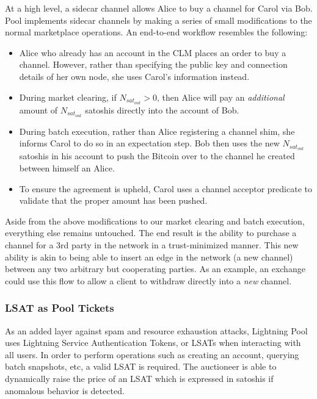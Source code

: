 \documentclass[10pt,a4paper]{article}
\theoremstyle{definition}
\begin{document}
At a high level, a sidecar channel allows Alice to buy a channel for Carol via
Bob. Pool implements sidecar channels by making a series of small modifications to
the normal marketplace operations. An end-to-end workflow resembles the
following:
\begin{itemize}
    \item Alice who already has an account in the CLM places an order to buy a
        channel. However, rather than specifying the public key and connection
        details of her own node, she uses Carol's information instead.

    \item During market clearing, if $N_{sat_{out}} > 0$, then Alice will pay
        an \emph{additional} amount of $N_{sat_{out}}$ satoshis directly into
        the account of Bob.

    \item During batch execution, rather than Alice registering a channel shim,
        she informs Carol to do so in an expectation step. Bob then uses the
        new $N_{sat_{out}}$ satoshis in his account to push the Bitcoin over to
        the channel he created between himself an Alice.

    \item To ensure the agreement is upheld, Carol uses a channel acceptor
        \cite{chanAcceptor} predicate to validate that the proper amount has been pushed.
\end{itemize}

Aside from the above modifications to our market clearing and batch execution,
everything else remains untouched. The end result is the ability to purchase a
channel for a 3rd party in the network in a trust-minimized manner. This new
ability is akin to being able to insert an edge in the network (a new channel)
between any two arbitrary but cooperating parties. As an example, an exchange
could use this flow to allow a client to withdraw directly into a \emph{new}
channel. 

\subsubsection{LSAT as Pool Tickets}

As an added layer against spam and resource exhaustion attacks, Lightning Pool
uses Lightning Service Authentication Tokens, or LSATs \cite{lsat} when
interacting with all users. In order to perform operations such as creating an
account, querying batch snapshots, etc, a valid LSAT is required. The
auctioneer is able to dynamically raise the price of an LSAT which is expressed
in satoshis if anomalous behavior is detected.
\end{document}

